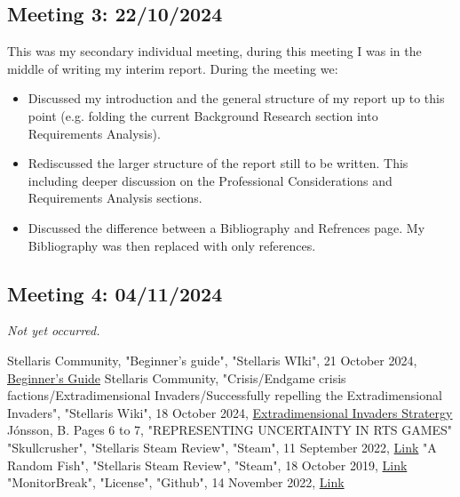 \documentclass{report}
\begin{document}
\subsection{Meeting 3: 22/10/2024}

This was my secondary individual meeting, during this meeting I was in the middle of writing my interim report. During the meeting we:
\begin{itemize}
  \item Discussed my introduction and the general structure of my report up to this point (e.g. folding the current Background Research section into Requirements Analysis).
  \item Rediscussed the larger structure of the report still to be written. This including deeper discussion on the Professional Considerations and Requirements Analysis sections.
  \item Discussed the difference between a Bibliography and Refrences page. My Bibliography was then replaced with only references.
\end{itemize}

\subsection{Meeting 4: 04/11/2024}

\textit{Not yet occurred.}

\renewcommand\bibname{References}
\begin{thebibliography}{9}
Stellaris Community, "Beginner's guide", "Stellaris WIki", 21 October 2024, \href{https://stellaris.paradoxwikis.com/Beginner\%27s_guide, Beginner's guide Link}{Beginner's Guide}
Stellaris Community, "Crisis/Endgame crisis factions/Extradimensional Invaders/Successfully repelling the Extradimensional Invaders", "Stellaris Wiki", 18 October 2024, \href{https://stellaris.paradoxwikis.com/Crisis#Successfully_repelling_the_Extradimensional_Invaders, Crisis Solution Link}{Extradimensional Invaders Stratergy}
Jónsson, B. Pages 6 to 7, "REPRESENTING UNCERTAINTY IN RTS GAMES"
"Skullcrusher", "Stellaris Steam Review", "Steam", 11 September 2022, \href{https://steamcommunity.com/profiles/76561198026459371/recommended/281990, "Review Link"}{Link}
"A Random Fish", "Stellaris Steam Review", "Steam", 18 October 2019, \href{https://steamcommunity.com/id/ARandomFish/recommended/281990, "Review Link"}{Link}
"MonitorBreak", "License", "Github", 14 November 2022, \href{https://github.com/Monitor-Break/Additions/blob/main/LICENSE}{Link}
\end{thebibliography}
\end{document}
